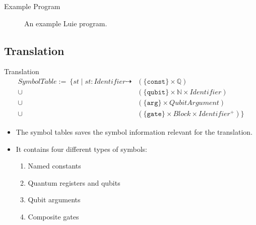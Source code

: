 \begin{frame}{Example Program}
    \begin{figure}[htp]
        \centering     
        
        \caption{An example Luie program.}
        \label{fig:qft_example}
    \end{figure}
\end{frame}


\subsection{Translation}
\begin{frame}{Translation}
    \begin{align*}
        SymbolTable := \ \{st \mid st : Identifier \dashrightarrow & (\{\texttt{const}\} \times \mathbb{Q})\\
        \cup& (\{\texttt{qubit}\} \times \mathbb{N} \times Identifier)\\
        \cup& (\{\texttt{arg}\} \times QubitArgument)\\
        \cup& (\{\texttt{gate}\} \times Block \times Identifier^+)
        \}
    \end{align*}
    \begin{itemize}
        \item The symbol tables saves the symbol information relevant for the translation.
        \item It contains four different types of symbols:
        \begin{enumerate}
            \item Named constants
            \item Quantum registers and qubits
            \item Qubit arguments
            \item Composite gates 
        \end{enumerate} 
    \end{itemize}
\end{frame}
